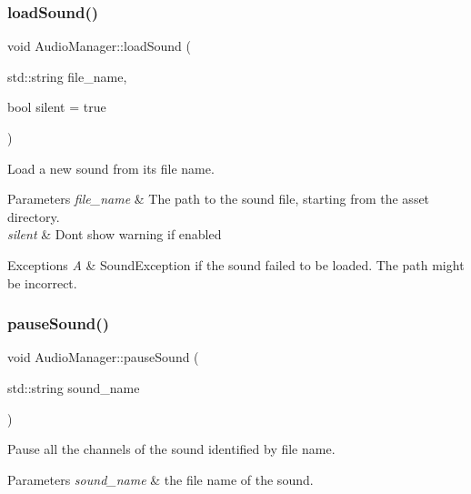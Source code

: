 \subsubsection{\texorpdfstring{load\+Sound()}{loadSound()}}
{\footnotesize\ttfamily void Audio\+Manager\+::load\+Sound (\begin{DoxyParamCaption}\item[{std\+::string}]{file\+\_\+name,  }\item[{bool}]{silent = {\ttfamily true} }\end{DoxyParamCaption})\hspace{0.3cm}{\ttfamily [static]}}



Load a new sound from its file name. 


\begin{DoxyParams}{Parameters}
{\em file\+\_\+name} & The path to the sound file, starting from the asset directory. \\
\hline
{\em silent} & Don\textquotesingle{}t show warning if enabled\\
\hline
\end{DoxyParams}

\begin{DoxyExceptions}{Exceptions}
{\em A} & Sound\+Exception if the sound failed to be loaded. The path might be incorrect. \\
\hline
\end{DoxyExceptions}
\mbox{\label{class_audio_manager_ada650abafa8b74a4a0d23cadccee033f}} 
\subsubsection{\texorpdfstring{pause\+Sound()}{pauseSound()}}
{\footnotesize\ttfamily void Audio\+Manager\+::pause\+Sound (\begin{DoxyParamCaption}\item[{std\+::string}]{sound\+\_\+name }\end{DoxyParamCaption})\hspace{0.3cm}{\ttfamily [static]}}



Pause all the channels of the sound identified by file name. 


\begin{DoxyParams}{Parameters}
{\em sound\+\_\+name} & the file name of the sound. \\
\hline
\end{DoxyParams}
\mbox{\label{class_audio_manager_ae0f9ebfae17ee406df9f2fb3b7701a4c}} 
